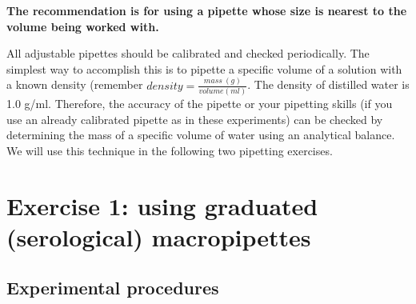 \documentclass[]{book}
\let\BeginKnitrBlock\begin \let\EndKnitrBlock\end
\begin{document}
\BeginKnitrBlock{rmdnote}
\textbf{The recommendation is for using a pipette whose size is nearest
to the volume being worked with.}
\EndKnitrBlock{rmdnote}

All adjustable pipettes should be calibrated and checked periodically.
The simplest way to accomplish this is to pipette a specific volume of a
solution with a known density (remember
\(density = \frac{mass\ (g)}{volume (ml)}\). The density of distilled
water is 1.0 g/ml. Therefore, the accuracy of the pipette or your
pipetting skills (if you use an already calibrated pipette as in these
experiments) can be checked by determining the mass of a specific volume
of water using an analytical balance. We will use this technique in the
following two pipetting exercises.

\section{Exercise 1: using graduated (serological)
macropipettes}\label{exercise-1-using-graduated-serological-macropipettes}

\subsection{Experimental procedures}\label{experimental-procedures-5}
\end{document}
